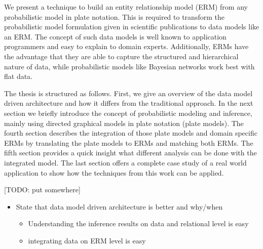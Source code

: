 We present a technique to build an entity relationship model (ERM) from any probabilistic model in plate notation. This is required to transform the probabilistic model formulation given in scientific publications to data models like an ERM. The concept of such data models is well known to application programmers and easy to explain to domain experts. Additionally, ERMs have the advantage that they are able to capture the structured and hierarchical nature of data, while probabilistic models like Bayesian networks work best with flat data.

The thesis is structured as follows. First, we give an overview of the data model driven architecture and how it differs from the traditional approach. In the next section we briefly introduce the concept of probabilistic modeling and inference, mainly using directed graphical models in plate notation (plate models). The fourth section describes the integration of those plate models and domain specific ERMs by translating the plate models to ERMs and matching both ERMs. The fifth section provides a quick insight what different analysis can be done with the integrated model. The last section offers a complete case study of a real world application to show how the techniques from this work can be applied.

[TODO: put somewhere]
\begin{itemize}
\item State that data model driven architecture is better and why/when
	\begin{itemize}
	\item Understanding the inference results on data and relational level is easy
	\item integrating data on ERM level is easy
	\end{itemize}
\end{itemize}
